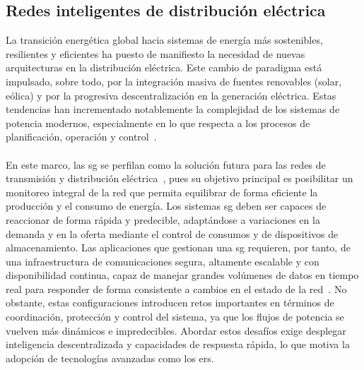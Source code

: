 \subsection{Redes inteligentes de distribución eléctrica}
\label{subsec:sg}

La transición energética global hacia sistemas de energía más sostenibles, resilientes y eficientes ha puesto de manifiesto la necesidad de nuevas arquitecturas en la distribución eléctrica. Este cambio de paradigma está impulsado, sobre todo, por la integración masiva de fuentes renovables (solar, eólica) y por la progresiva descentralización en la generación eléctrica. Estas tendencias han incrementado notablemente la complejidad de los sistemas de potencia modernos, especialmente en lo que respecta a los procesos de planificación, operación y control~\cite{GADELHA2024110581}.\\
\\
En este marco, las \gls{sg} se perfilan como la solución futura para las redes de transmisión y distribución eléctrica~\cite{Vu1997,Amin2005}, pues su objetivo principal es posibilitar un monitoreo integral de la red que permita equilibrar de forma eficiente la producción y el consumo de energía. Los sistemas \gls{sg} deben ser capaces de reaccionar de forma rápida y predecible, adaptándose a variaciones en la demanda y en la oferta mediante el control de consumos y de dispositivos de almacenamiento. Las aplicaciones que gestionan una \gls{sg} requieren, por tanto, de una infraestructura de comunicaciones segura, altamente escalable y con disponibilidad continua, capaz de manejar grandes volúmenes de datos en tiempo real para responder de forma consistente a cambios en el estado de la red~\cite{zhang2018big}. No obstante, estas configuraciones introducen retos importantes en términos de coordinación, protección y control del sistema, ya que los flujos de potencia se vuelven más dinámicos e impredecibles. Abordar estos desafíos exige desplegar inteligencia descentralizada y capacidades de respuesta rápida, lo que motiva la adopción de tecnologías avanzadas como los \glspl{er}.\\
\\

